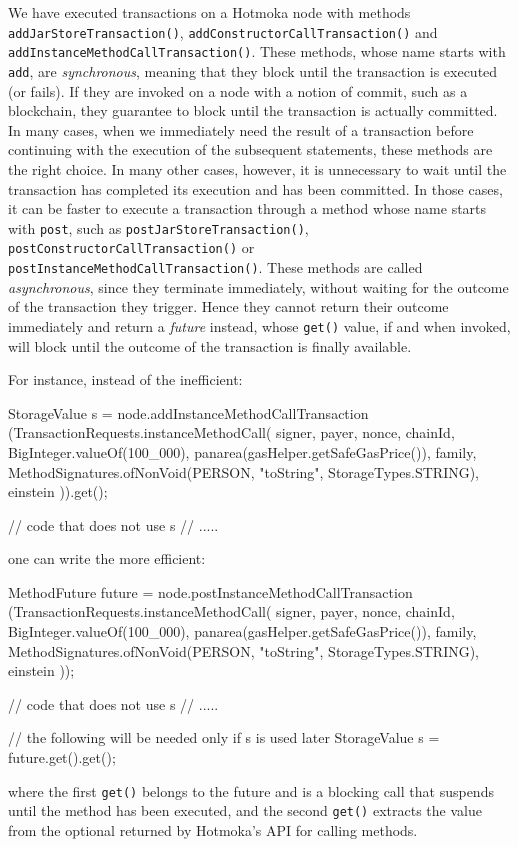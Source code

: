We have executed transactions on a Hotmoka node with methods
\texttt{addJarStoreTransaction()}, \texttt{addConstructorCallTransaction()}
and \texttt{addInstanceMethodCallTransaction()}. These methods, whose name
starts with \texttt{add},
are \emph{synchronous}, meaning that they block until the transaction is
executed (or fails). If they are invoked on a node with a notion of
commit, such as a blockchain, they guarantee to block until
the transaction is actually committed.
In many cases, when we immediately need the result of a transaction
before continuing with the execution of the
subsequent statements,
these methods are the right choice. In many other cases, however,
it is unnecessary to wait until the transaction has completed
its execution and has been committed. In those cases, it can
be faster to execute a transaction through a method whose name
starts with \texttt{post}, such as
\texttt{postJarStoreTransaction()}, \texttt{postConstructorCallTransaction()}
or \texttt{postInstanceMethodCallTransaction()}. These methods are called
\emph{asynchronous}, since they terminate
immediately, without waiting for the outcome of the transaction
they trigger. Hence they cannot return their outcome immediately
and return a \emph{future}
instead, whose \texttt{get()} value, if and when invoked, will block
until the outcome of the transaction is finally available.

For instance, instead of the inefficient:
%
\begin{codebox}\begin{javalst}
StorageValue s = node.addInstanceMethodCallTransaction
  (TransactionRequests.instanceMethodCall(
    signer,
    payer,
    nonce,
    chainId,
    BigInteger.valueOf(100_000),
    panarea(gasHelper.getSafeGasPrice()),
    family,
    MethodSignatures.ofNonVoid(PERSON, "toString", StorageTypes.STRING),
    einstein
  )).get();

// code that does not use s
// .....
\end{javalst}\end{codebox}
%
one can write the more efficient:
%
\begin{codebox}\begin{javalst}
MethodFuture future = node.postInstanceMethodCallTransaction
  (TransactionRequests.instanceMethodCall(
    signer,
    payer,
    nonce,
    chainId,
    BigInteger.valueOf(100_000),
    panarea(gasHelper.getSafeGasPrice()),
    family,
    MethodSignatures.ofNonVoid(PERSON, "toString", StorageTypes.STRING),
    einstein
  ));

// code that does not use s
// .....

// the following will be needed only if s is used later
StorageValue s = future.get().get();
\end{javalst}\end{codebox}
%
where the first \texttt{get()} belongs to the future and is a blocking call
that suspends until the method has been executed, and the second
\texttt{get()} extracts the value from the optional returned by Hotmoka's
API for calling methods.

